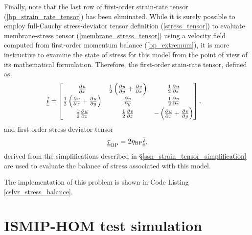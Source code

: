 Finally, note that the last row of first-order strain-rate tensor (\ref{bp_strain_rate_tensor}) has been eliminated.  While it is surely possible to employ full-Cauchy stress-deviator tensor definition (\ref{stress_tensor}) to evaluate membrane-stress tensor (\ref{membrane_stress_tensor}) using a velocity field computed from first-order momentum balance (\ref{bp_extremum}), it is more instructive to examine the state of stress for this model from the point of view of its mathematical formulation.  Therefore, the first-order stain-rate tensor,  defined as
\begin{align}
  \label{bp_full_strain_rate_tensor}
  \underline{\underline{\tilde{\dot{\epsilon}}}}
  &= \begin{bmatrix}
       \frac{\partial^{} u}{\partial x^{} } & \frac{1}{2}\left( \frac{\partial^{} u}{\partial y^{} } + \frac{\partial^{} v}{\partial x^{} } \right) & \frac{1}{2} \frac{\partial^{} u}{\partial z^{} } \\
       \frac{1}{2}\left( \frac{\partial^{} v}{\partial x^{} } + \frac{\partial^{} u}{\partial y^{} } \right) & \frac{\partial^{} v}{\partial y^{} } & \frac{1}{2} \frac{\partial^{} v}{\partial z^{} } \\
       \frac{1}{2} \frac{\partial^{} u}{\partial z^{} } & \frac{1}{2} \frac{\partial^{} v}{\partial z^{} } & -\left( \frac{\partial^{} u}{\partial x^{} } + \frac{\partial^{} v}{\partial y^{} } \right)
     \end{bmatrix},
\end{align}
and first-order stress-deviator tensor
\begin{align}
  \label{bp_full_stress_deviator}
  \underline{\underline{\tau}}_{\text{BP}} = 2 \eta_{\text{BP}} \underline{\underline{\tilde{\dot{\epsilon}}}},
\end{align}
derived from the simplifications described in \S \ref{ssn_strain_tensor_simplification} are used to evaluate the balance of stress associated with this model.

The \CSLVR implementation of this problem is shown in Code Listing \ref{cslvr_stress_balance}.


\section{ISMIP-HOM test simulation} \label{ssn_stress_balance_ismip_hom_test_simulations}

